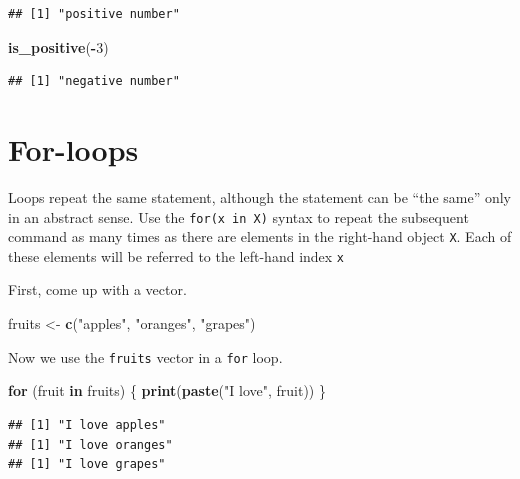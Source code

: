 \documentclass[]{book}
\newenvironment{Shaded}{\begin{snugshade}}{\end{snugshade}}
\newcommand{\ControlFlowTok}[1]{\textcolor[rgb]{0.13,0.29,0.53}{\textbf{#1}}}
\newcommand{\DecValTok}[1]{\textcolor[rgb]{0.00,0.00,0.81}{#1}}
\newcommand{\KeywordTok}[1]{\textcolor[rgb]{0.13,0.29,0.53}{\textbf{#1}}}
\newcommand{\NormalTok}[1]{#1}
\newcommand{\OperatorTok}[1]{\textcolor[rgb]{0.81,0.36,0.00}{\textbf{#1}}}
\newcommand{\StringTok}[1]{\textcolor[rgb]{0.31,0.60,0.02}{#1}}
\theoremstyle{definition}
\theoremstyle{definition}
\theoremstyle{definition}
\theoremstyle{remark}
\begin{document}
\begin{verbatim}
## [1] "positive number"
\end{verbatim}

\begin{Shaded}
\begin{Highlighting}[]
\KeywordTok{is_positive}\NormalTok{(}\OperatorTok{-}\DecValTok{3}\NormalTok{)}
\end{Highlighting}
\end{Shaded}

\begin{verbatim}
## [1] "negative number"
\end{verbatim}

\hypertarget{for-loops}{%
\section{For-loops}\label{for-loops}}

Loops repeat the same statement, although the statement can be ``the same'' only in an abstract sense. Use the \texttt{for(x\ in\ X)} syntax to repeat the subsequent command as many times as there are elements in the right-hand object \texttt{X}. Each of these elements will be referred to the left-hand index \texttt{x}

First, come up with a vector.

\begin{Shaded}
\begin{Highlighting}[]
\NormalTok{fruits <-}\StringTok{ }\KeywordTok{c}\NormalTok{(}\StringTok{"apples"}\NormalTok{, }\StringTok{"oranges"}\NormalTok{, }\StringTok{"grapes"}\NormalTok{)}
\end{Highlighting}
\end{Shaded}

Now we use the \texttt{fruits} vector in a \texttt{for} loop.

\begin{Shaded}
\begin{Highlighting}[]
\ControlFlowTok{for}\NormalTok{ (fruit }\ControlFlowTok{in}\NormalTok{ fruits) \{}
  \KeywordTok{print}\NormalTok{(}\KeywordTok{paste}\NormalTok{(}\StringTok{"I love"}\NormalTok{, fruit))}
\NormalTok{\}}
\end{Highlighting}
\end{Shaded}

\begin{verbatim}
## [1] "I love apples"
## [1] "I love oranges"
## [1] "I love grapes"
\end{verbatim}
\end{document}
